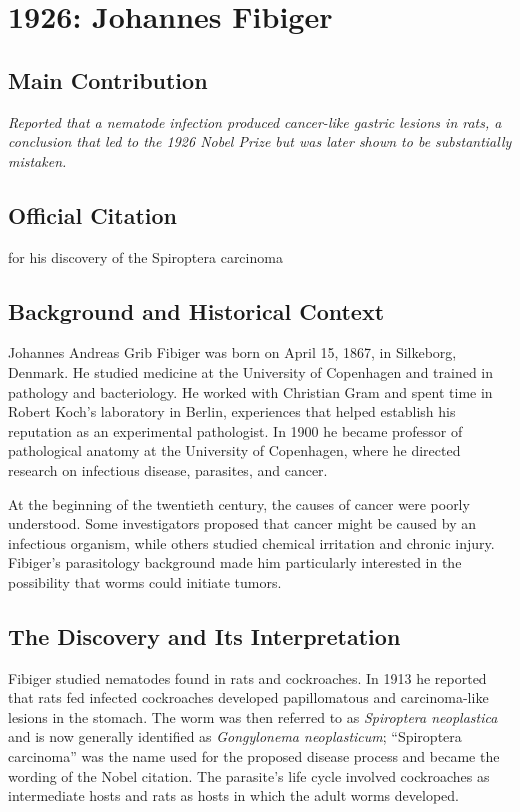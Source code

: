 \chapter[1926 --- Fibiger]{1926: Johannes Fibiger}
\label{ch:1926_johannesfibiger}

\section*{Main Contribution}

\textit{Reported that a nematode infection produced cancer-like gastric lesions in rats, a conclusion that led to the 1926 Nobel Prize but was later shown to be substantially mistaken.}

\section{Official Citation}

for his discovery of the Spiroptera carcinoma\cite{nobel-1926}

\section{Background and Historical Context}

Johannes Andreas Grib Fibiger was born on April 15, 1867, in Silkeborg, Denmark. He studied medicine at the University of Copenhagen and trained in pathology and bacteriology. He worked with Christian Gram and spent time in Robert Koch's laboratory in Berlin, experiences that helped establish his reputation as an experimental pathologist. In 1900 he became professor of pathological anatomy at the University of Copenhagen, where he directed research on infectious disease, parasites, and cancer.

At the beginning of the twentieth century, the causes of cancer were poorly understood. Some investigators proposed that cancer might be caused by an infectious organism, while others studied chemical irritation and chronic injury. Fibiger's parasitology background made him particularly interested in the possibility that worms could initiate tumors.

\section{The Discovery and Its Interpretation}

Fibiger studied nematodes found in rats and cockroaches. In 1913 he reported that rats fed infected cockroaches developed papillomatous and carcinoma-like lesions in the stomach. The worm was then referred to as \emph{Spiroptera neoplastica} and is now generally identified as \emph{Gongylonema neoplasticum}; ``Spiroptera carcinoma'' was the name used for the proposed disease process and became the wording of the Nobel citation. The parasite's life cycle involved cockroaches as intermediate hosts and rats as hosts in which the adult worms developed.\cite{cancer-history}

